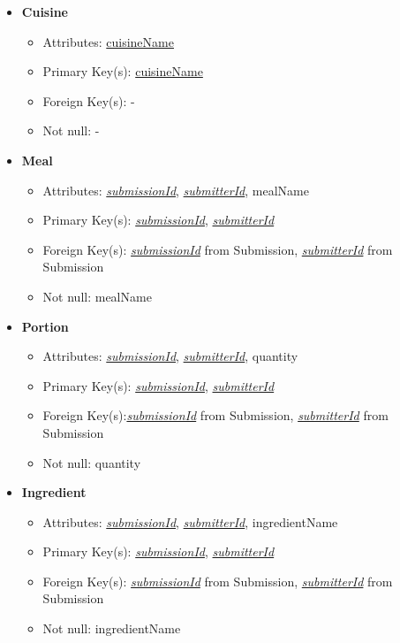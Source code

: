 \documentclass{article}
\begin{document}
\begin{itemize}
        \item \textbf{Cuisine}
        \begin{itemize}
            \item Attributes: \underline{cuisineName}
            \item Primary Key(s): \underline{cuisineName}
            \item Foreign Key(s): -
            \item Not null: -
        \end{itemize}

        \item \textbf{Meal}
        \begin{itemize}
            \item Attributes: \underline{\textit{submissionId}}, \underline{\textit{submitterId}}, mealName
            \item Primary Key(s): \underline{\textit{submissionId}}, \underline{\textit{submitterId}}
            \item Foreign Key(s): \underline{\textit{submissionId}} from Submission, \underline{\textit{submitterId}} from Submission
            \item Not null: mealName
        \end{itemize}

        \item \textbf{Portion}
        \begin{itemize}
            \item Attributes: \underline{\textit{submissionId}}, \underline{\textit{submitterId}}, quantity
            \item Primary Key(s): \underline{\textit{submissionId}}, \underline{\textit{submitterId}}
            \item Foreign Key(s):\underline{\textit{submissionId}} from Submission, \underline{\textit{submitterId}} from Submission
            \item Not null: quantity
        \end{itemize}

        \item \textbf{Ingredient}
        \begin{itemize}
            \item Attributes: \underline{\textit{submissionId}}, \underline{\textit{submitterId}}, ingredientName
            \item Primary Key(s): \underline{\textit{submissionId}}, \underline{\textit{submitterId}}
            \item Foreign Key(s): \underline{\textit{submissionId}} from Submission, \underline{\textit{submitterId}} from Submission
            \item Not null: ingredientName
        \end{itemize}

    \end{itemize}
    
\end{document}
